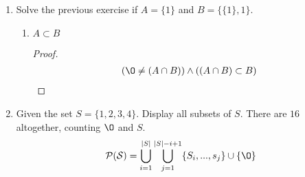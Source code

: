 \begin{enumerate}
\begin{enumerate}
    \item \begin{proposition}
      $1 \subset B$
    \end{proposition}
    \begin{proof}
      \begin{equation}
        \begin{split}
          & \forall x \in \mathcal{P(B)}: 1 \neq x \text{, where } \mathcal{P(B)} \text{ is the powerset of B and x each subset} \\
          & \therefore 1 \not \subset B
        \end{split}
      \end{equation}
    \end{proof}
  \end{enumerate}

  \item Solve the previous exercise if $A = \{1\}$ and $B = \{ \{1 \}, 1 \}$.
  \begin{enumerate}
    \item \begin{proposition}
      $A \subset B$
    \end{proposition}
    \begin{proof}
      \begin{equation}
        \begin{split}
          (\O \neq (A \cap B)) \land ((A \cap B) \subset B)
        \end{split}
      \end{equation}
    \end{proof}
  \end{enumerate}

  \item Given the set $S = \{1, 2, 3, 4\}$. Display all subsets of $S$. There are $16$ altogether, counting $\O$ and $S$.
  \begin{equation}
    \begin{split}
      \mathcal{P(S)} = \bigcup\limits_{i=1}^{|S|} \bigcup\limits_{j=1}^{|S|-i+1} \{S_{i}, ..., s_{j}\} \cup \{\O\}
    \end{split}
  \end{equation}


\end{enumerate}
